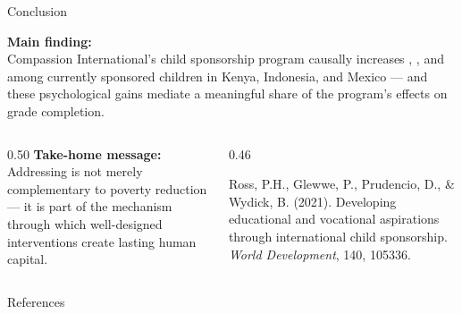 \documentclass[aspectratio=169, 10pt]{beamer}
\begin{document}
\begin{frame}{Conclusion}
  \vspace{0.5em}
  \begin{resultbox}
    \textbf{Main finding:}\\[0.5em]
    Compassion International's child sponsorship program causally increases , , and  among currently sponsored children in Kenya, Indonesia, and Mexico --- and these psychological gains mediate a meaningful share of the program's effects on grade completion.
  \end{resultbox}
  \vspace{0.8em}
  \begin{columns}
    \begin{column}{0.50\textwidth}
      \textbf{Take-home message:}\\[0.3em]
      Addressing  is not merely complementary to poverty reduction --- it is part of the mechanism through which well-designed interventions create lasting human capital.
    \end{column}
    \begin{column}{0.46\textwidth}
      \begin{keybox}
        \small Ross, P.H., Glewwe, P., Prudencio, D., \& Wydick, B. (2021). Developing educational and vocational aspirations through international child sponsorship. \textit{World Development}, 140, 105336.
      \end{keybox}
    \end{column}
  \end{columns}
\end{frame}

\begin{frame}[allowframebreaks]{References}
  \tiny
  
\end{frame}
\end{document}
